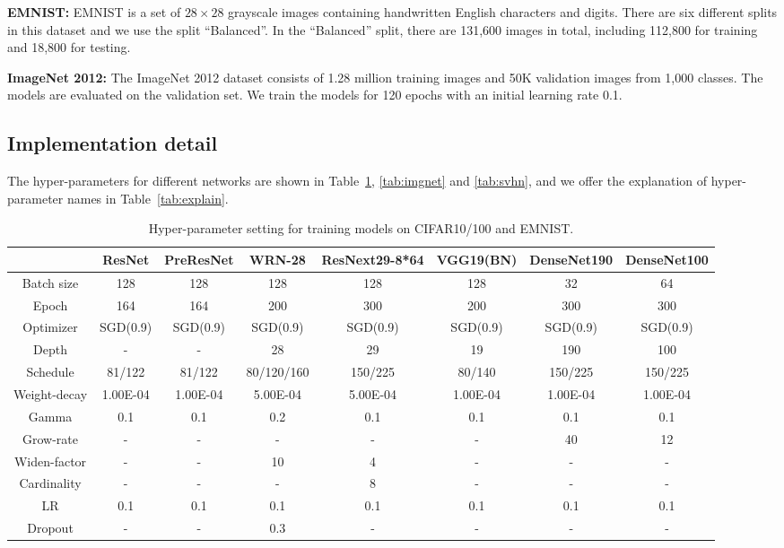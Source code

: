 \documentclass[11pt]{article}
\begin{document}
\textbf{EMNIST:} EMNIST is a set of $28\times 28$ grayscale images containing handwritten English characters and digits. There are six different splits in this dataset and we use the split ``Balanced''. In the ``Balanced'' split, there are 131,600 images in total, including 112,800 for training and 18,800 for testing.


\textbf{ImageNet 2012:} The ImageNet 2012 dataset consists of 1.28 million training images and 50K validation images from 1,000 classes. The models are evaluated on the validation set. We train the models for 120 epochs with an initial learning rate 0.1.
\subsection{Implementation detail}
The hyper-parameters for different networks are shown in Table~\ref{tab:cifar-params}, \ref{tab:imgnet} and \ref{tab:svhn}, and we offer the explanation of hyper-parameter names in Table~\ref{tab:explain}.
\begin{table}[htbp]
\scriptsize
  \centering
    \begin{tabular}{|c|c|c|c|c|c|c|c|}
    \toprule
          & ResNet & PreResNet & WRN-28 & ResNext29-8*64 & VGG19(BN) & DenseNet190 & DenseNet100 \\
    \midrule
    Batch size & 128   & 128   & 128   & 128   & 128   & 32    & 64 \\
    Epoch & 164   & 164   & 200   & 300   & 200   & 300   & 300 \\
    Optimizer & SGD(0.9) & SGD(0.9) & SGD(0.9) & SGD(0.9) & SGD(0.9) & SGD(0.9) & SGD(0.9) \\
    Depth & -     & -     & 28    & 29    & 19    & 190   & 100 \\
    Schedule & 81/122 & 81/122 & 80/120/160 & 150/225 & 80/140 & 150/225 & 150/225 \\
    Weight-decay & 1.00E-04 & 1.00E-04 & 5.00E-04 & 5.00E-04 & 1.00E-04 & 1.00E-04 & 1.00E-04 \\
    Gamma & 0.1   & 0.1   & 0.2   & 0.1   & 0.1   & 0.1   & 0.1 \\
    Grow-rate & -     & -     & -     & -     & -     & 40    & 12 \\
    Widen-factor & -     & -     & 10    & 4     & -     & -     & - \\
    Cardinality & -     & -     & -     & 8     & -     & -     & - \\
    LR    & 0.1   & 0.1   & 0.1   & 0.1   & 0.1   & 0.1   & 0.1 \\
    Dropout & -     & -     & 0.3   & -     & -     & -     & - \\
    \bottomrule
    \end{tabular}\caption{Hyper-parameter setting for training models on CIFAR10/100 and EMNIST.}
  \label{tab:cifar-params}\end{table}
\end{document}
